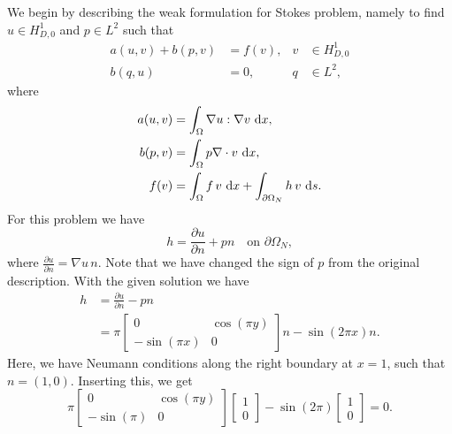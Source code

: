 \begin{solution}{6.6}\label{sol:6.6}
    We begin by describing the weak formulation for Stokes problem, namely to find $u \in H_{D,0}^{1}$ and $p \in L^{2}$ such that
    \begin{align*}
        a(u, v) + b(p, v) &= f(v), & v &\in H_{D,0}^{1} \\
        b(q, u) &= 0, & q &\in L^{2},
    \end{align*}
    where
    \begin{align*}
        a(u, v) &= \int_{\Omega} \nabla u : \nabla v \, \mathop{}\!\mathrm{d} x, \\
        b(p, v) &= \int_\Omega p \nabla \cdot v \, \mathop{}\!\mathrm{d} x, \\
        f(v) &= \int_{\Omega} f \, v \, \mathop{}\!\mathrm{d} x + \int_{\partial\Omega_N} h \, v \, \mathop{}\!\mathrm{d} s.
    \end{align*}
    For this problem we have
    \begin{equation*}
        h = \frac{\partial u}{\partial n} + p n \quad \text{on } \partial\Omega_N,
    \end{equation*}
    where $\frac{\partial u}{\partial n} = \nabla u \, n$.
    Note that we have changed the sign of $p$ from the original description.
    With the given solution we have
    \begin{align*}
        h &= \frac{\partial u}{\partial n} - p n \\
        &= \pi
        \begin{bmatrix}
            0 & \cos(\pi y) \\
            -\sin(\pi x) & 0
        \end{bmatrix} n - \sin(2 \pi x) n.
    \end{align*}
    Here, we have Neumann conditions along the right boundary at $x = 1$, such that $n = (1, 0)$.
    Inserting this, we get
    \begin{equation*}
        \pi
        \begin{bmatrix}
            0 & \cos(\pi y) \\
            -\sin(\pi) & 0
        \end{bmatrix}
        \begin{bmatrix}
            1 \\ 0
        \end{bmatrix} - \sin(2 \pi)
        \begin{bmatrix}
            1 \\ 0
        \end{bmatrix}
        = 0.
    \end{equation*}


\end{solution}
